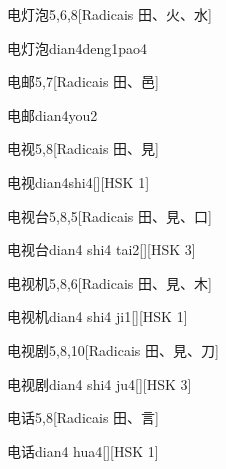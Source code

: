 \begin{entry}{电灯泡}{5,6,8}[Radicais ⽥、⽕、⽔]
  \begin{phonetics}{电灯泡}{dian4deng1pao4}
  \end{phonetics}
\end{entry}

\begin{entry}{电邮}{5,7}[Radicais ⽥、⾢]
  \begin{phonetics}{电邮}{dian4you2}
  \end{phonetics}
\end{entry}

\begin{entry}{电视}{5,8}[Radicais ⽥、⾒]
  \begin{phonetics}{电视}{dian4shi4}[][HSK 1]
  \end{phonetics}
\end{entry}

\begin{entry}{电视台}{5,8,5}[Radicais ⽥、⾒、⼝]
  \begin{phonetics}{电视台}{dian4 shi4 tai2}[][HSK 3]
  \end{phonetics}
\end{entry}

\begin{entry}{电视机}{5,8,6}[Radicais ⽥、⾒、⽊]
  \begin{phonetics}{电视机}{dian4 shi4 ji1}[][HSK 1]
  \end{phonetics}
\end{entry}

\begin{entry}{电视剧}{5,8,10}[Radicais ⽥、⾒、⼑]
  \begin{phonetics}{电视剧}{dian4 shi4 ju4}[][HSK 3]
  \end{phonetics}
\end{entry}

\begin{entry}{电话}{5,8}[Radicais ⽥、⾔]
  \begin{phonetics}{电话}{dian4 hua4}[][HSK 1]
  \end{phonetics}
\end{entry}

